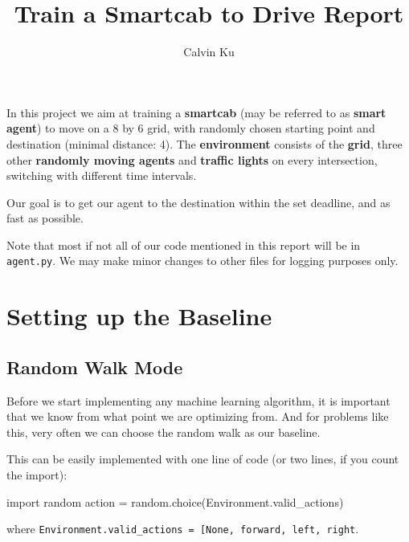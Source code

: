 \documentclass{article}
\title{Train a Smartcab to Drive Report}
\author{Calvin Ku}
\newenvironment{Shaded}{}{}
\newcommand{\NormalTok}[1]{{#1}}
\newcommand{\ImportTok}[1]{{#1}}
\newcommand{\OperatorTok}[1]{\textcolor[rgb]{0.40,0.40,0.40}{{#1}}}
\begin{document}
    \maketitle



In this project we aim at training a \textbf{smartcab} (may be referred
to as \textbf{smart agent}) to move on a 8 by 6 grid, with randomly
chosen starting point and destination (minimal distance: 4). The
\textbf{environment} consists of the \textbf{grid}, three other
\textbf{randomly moving agents} and \textbf{traffic lights} on every
intersection, switching with different time intervals.

Our goal is to get our agent to the destination within the set deadline,
and as fast as possible.

Note that most if not all of our code mentioned in this report will be
in \texttt{agent.py}. We may make minor changes to other files for
logging purposes only.

\section{Setting up the Baseline}\label{setting-up-the-baseline}

\subsection{Random Walk Mode}\label{random-walk-mode}

Before we start implementing any machine learning algorithm, it is
important that we know from what point we are optimizing from. And for
problems like this, very often we can choose the random walk as our
baseline.

This can be easily implemented with one line of code (or two lines, if
you count the import):

\begin{Shaded}
\begin{Highlighting}[]
\ImportTok{import} \NormalTok{random}
\NormalTok{action }\OperatorTok{=} \NormalTok{random.choice(Environment.valid_actions)}
\end{Highlighting}
\end{Shaded}

where
\texttt{Environment.valid\_actions\ =\ {[}None,\ \textquotesingle{}forward\textquotesingle{},\ \textquotesingle{}left\textquotesingle{},\ \textquotesingle{}right\textquotesingle{}{]}}.
\end{document}
